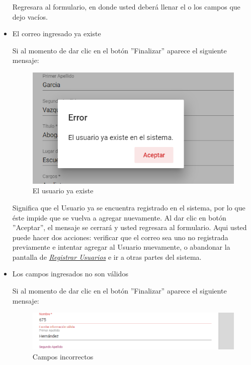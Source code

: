 \begin{itemize}
\begin{figure}[!hbtp]
                         \end{figure}
                           
                           Regresara  al formulario, en donde usted deberá llenar el o los campos que dejo vacíos. 
                          \item El correo ingresado ya existe
                        
                        Si al momento de dar clic en el botón ''Finalizar'' aparece el siguiente mensaje:
                        
                        \begin{figure}[!hbtp]
                        	\centering
                        	\includegraphics[width=0.4\linewidth]{images/SP5/MSG36}
                        	\caption{El usuario ya existe}
                        	\label{mensaje36}
                        	
                        \end{figure}
                        
                        Significa que el Usuario ya se encuentra registrado en el sistema, por lo que éste impide que se vuelva a agregar nuevamente. Al dar clic en botón ''Aceptar'', el mensaje se cerrará y usted regresara al formulario. Aqui usted puede hacer dos acciones: verificar que el correo sea uno no registrada previamente e intentar agregar al Usuario nuevamente, o abandonar la pantalla de \hyperlink{registrarUs}{\textit{Registrar Usuarios}} e ir a otras partes del sistema.
                
                        \item Los campos ingresados no son válidos
                        
                            Si al momento de dar clic en el botón ''Finalizar'' aparece el siguiente mensaje:
                            \clearpage
                                \begin{figure}[!hbtp]
                         	\centering
                         	\includegraphics[width=0.4\linewidth]{images/SP5/MSG35}
                         	\caption{Campos incorrectos}
                         	\label{mensaje35}
                         	

\end{figure}
\end{itemize}
